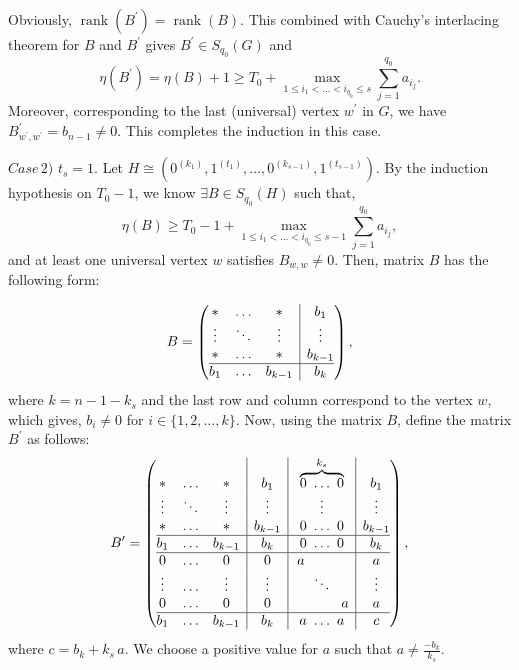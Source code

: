 \documentclass[3p,times,12pt]{article}
\DeclareMathOperator{\rank}{rank}
\begin{document}
Obviously, $\rank(B^{\prime})=\rank(B)$. This combined with Cauchy's interlacing theorem for $B$ and $B^{\prime}$ gives $B^{\prime}\in S_{q_0}(G)$ and
 \begin{equation}\nonumber
\eta(B^{\prime})=\eta(B)+1\ge T_0+\max_{1 \le i_1<\ldots<i_{q_0} \le s} \sum_{j=1}^{q_0} a_{i_j}.
 \end{equation}
 Moreover, corresponding to the last (universal) vertex $w^{\prime}$ in $G$, we have $B^{\prime}_{w^{\prime}, w^{\prime}}=b_{n-1}\neq 0$. This completes the induction in this case. 

\vspace{3mm} 

$Case\, 2)$ $t_s=1$. Let $H\cong (0^{(k_1)}, 1^{(t_1)}, \ldots,0^{(k_{s-1})}, 1^{(t_{s-1})})$. By the induction hypothesis on $T_0 -1$, we know 
 $\exists B\in S_{q_0}(H)$ such that,
 \begin{equation}\label{}
\eta(B)\ge T_0-1+\max_{1 \le i_1<\ldots<i_{q_0} \le s-1} \sum_{j=1}^{q_0} a_{i_j},
 \end{equation}
  and at least one universal vertex $w$ satisfies $B_{w,w}\neq 0$. Then, matrix $B$ has the following form:
  
   $$B= \left(\begin{array}{@{}ccc|c@{}}
    * & \ldots & *& b_1  \\
    \vdots & \ddots & \vdots & \vdots  \\
    * & \ldots & * & b_{k-1}  \\\hline
    b_1 & \ldots & b_{k-1} & b_{k}  \\
  \end{array}\right),$$  where $k=n-1-k_s$ and the last row and column correspond to the vertex $w$, which gives,  $b_i\neq 0$ for $i\in \{1,2,\ldots, k\}$. Now, using the matrix $B$,  define the matrix $B^{\prime}$ as follows: 
 $$B^{\prime}= \left(\begin{array}{@{}ccc|c|c|c@{}}
    * & \ldots & *& b_1 &\overbrace{0 ~\ldots ~ 0}^{k_s} & b_1 \\
    \vdots & \ddots & \vdots & \vdots &\vdots & \vdots \\
    * & \ldots & * & b_{k-1}  & 0~ \ldots ~ 0 &b_{k-1} \\\hline
    b_1 & \ldots & b_{k-1}  & b_k& 0 ~\ldots ~0 & b_k \\\hline
    0 & \ldots & 0  & 0& a ~~~~~~~~~ & a \\
    \vdots & \ldots & \vdots  & \vdots & \ddots & \vdots \\
   0 & \ldots & 0  & 0& ~~~~~~~~~~a & a \\\hline
    b_1 & \ldots & b_{k-1} & b_k & a~\ldots~a  & c
  \end{array}\right),$$ where $c=b_k+k_s\,a$. We choose a positive value for $a$ such that   $a\neq \frac{-b_k}{k_s}$. 
\end{document}
